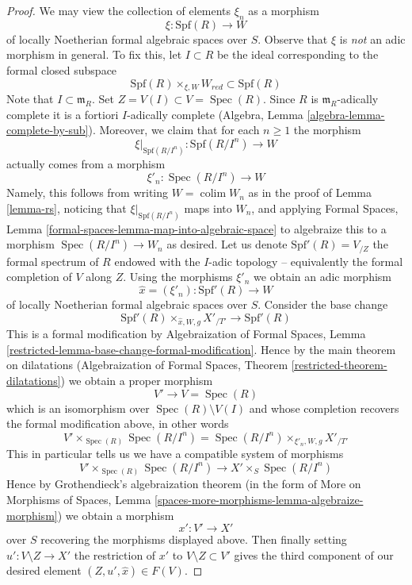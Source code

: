 \documentclass{stacks-project}
\theoremstyle{plain}
\theoremstyle{definition}
\theoremstyle{remark}
\numberwithin{equation}{subsection}
\def\colim{\mathop{\mathrm{colim}}\nolimits}
\def\Spec{\mathop{\mathrm{Spec}}}
\begin{document}
\begin{proof}
\medskip\noindent
We may view the collection of elements $\xi_n$ as a morphism
$$
\xi : \text{Spf}(R) \longrightarrow W
$$
of locally Noetherian formal algebraic spaces over $S$. Observe that $\xi$
is {\it not} an adic morphism in general. To fix this, let $I \subset R$
be the ideal corresponding to the formal closed subspace
$$
\text{Spf}(R) \times_{\xi, W} W_{red} \subset \text{Spf}(R)
$$
Note that $I \subset \mathfrak m_R$. Set $Z = V(I) \subset V = \Spec(R)$.
Since $R$ is $\mathfrak m_R$-adically complete it is a fortiori
$I$-adically complete (Algebra, Lemma \ref{algebra-lemma-complete-by-sub}).
Moreover, we claim that for each $n \geq 1$ the morphism
$$
\xi|_{\text{Spf}(R/I^n)} :
\text{Spf}(R/I^n)
\longrightarrow
W
$$
actually comes from a morphism
$$
\xi'_n :  \Spec(R/I^n) \longrightarrow W
$$
Namely, this follows from writing $W = \colim W_n$ as in the
proof of Lemma \ref{lemma-rs}, noticing that $\xi|_{\text{Spf}(R/I^n)}$
maps into $W_n$, and applying Formal Spaces, Lemma
\ref{formal-spaces-lemma-map-into-algebraic-space}
to algebraize this to a morphism $\Spec(R/I^n) \to W_n$
as desired. Let us denote $\text{Spf}'(R) = V_{/Z}$ the formal spectrum
of $R$ endowed with the $I$-adic topology -- equivalently the formal
completion of $V$ along $Z$. Using the morphisms
$\xi'_n$ we obtain an adic morphism
$$
\hat x = (\xi'_n) : \text{Spf}'(R) \longrightarrow W
$$
of locally Noetherian formal algebraic spaces over $S$.
Consider the base change
$$
\text{Spf}'(R) \times_{\hat x, W, g} X'_{/T'} \longrightarrow \text{Spf}'(R)
$$
This is a formal modification by
Algebraization of Formal Spaces, Lemma
\ref{restricted-lemma-base-change-formal-modification}.
Hence by the main theorem on dilatations
(Algebraization of Formal Spaces, Theorem \ref{restricted-theorem-dilatations})
we obtain a proper morphism
$$
V' \longrightarrow V = \Spec(R)
$$
which is an isomorphism over $\Spec(R) \setminus V(I)$ and
whose completion recovers the formal modification above, in other words
$$
V' \times_{\Spec(R)} \Spec(R/I^n) =
\Spec(R/I^n) \times_{\xi'_n, W, g} X'_{/T'}
$$
This in particular tells us we have a compatible system of morphisms
$$
V' \times_{\Spec(R)} \Spec(R/I^n) \longrightarrow X' \times_S \Spec(R/I^n)
$$
Hence by Grothendieck's algebraization theorem (in the form of
More on Morphisms of Spaces, Lemma
\ref{spaces-more-morphisms-lemma-algebraize-morphism})
we obtain a morphism
$$
x' : V' \to X'
$$
over $S$ recovering the morphisms displayed above. Then finally
setting $u' : V \setminus Z \to X'$ the restriction of $x'$ to
$V \setminus Z \subset V'$ gives the third component of our
desired element $(Z, u', \hat x) \in F(V)$.
\end{proof}
\end{document}
